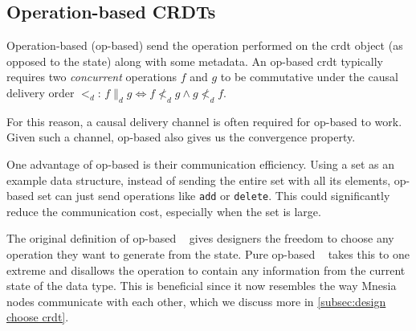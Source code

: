 \subsection{Operation-based CRDTs} \label{subsec:bg op-based crdts}

Operation-based (op-based)  send the operation performed on 
the \acrshort{crdt} object (as opposed to the state) along with some metadata.
An op-based \acrshort{crdt} typically requires two \emph{concurrent}
operations \(f\) and \(g\) to 
be commutative under the causal delivery order \(<_d\): 
\(f \parallel_d g \iff f\not <_d g \land g\not <_d f\). 

For this reason, a causal delivery channel is often required for op-based
 to work. Given such a channel,  op-based 
also gives us the convergence property.


One advantage of op-based  is their communication efficiency.
Using a set as an example data structure, instead of sending the
entire set with all its elements,
op-based set can just send operations like \texttt{add} or \texttt{delete}.
This could significantly reduce the communication cost, especially when the set 
is large.

The original definition of op-based ~\cite{shapiro2011CRDT}
gives designers the freedom to choose any operation they want to generate
from the state. Pure op-based ~\cite{baquero2017PureOp,baquero2014PureOp} 
takes this to one extreme and disallows the operation to contain any information
from the current state of the data type. This is beneficial since it now resembles
the way Mnesia nodes communicate with each other, which we discuss more in
\cref{subsec:design choose crdt}.



